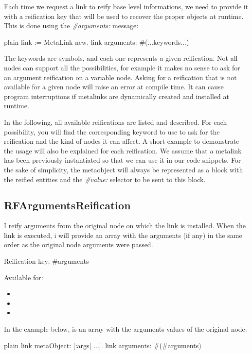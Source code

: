 \documentclass[10pt,twoside,english]{_support/latex/sbabook/sbabook}
\begin{document}
Each time we request a link to reify base level informations, we need to provide it with a reification key that will be used to recover the proper objects at runtime. This is done using the \textit{\#arguments:} message: 

\begin{displaycode}{plain}
link := MetaLink new.
link arguments: #(...keywords...)
\end{displaycode}

The keywords are symbols, and each one represents a given reification. Not all nodes can support all the possibilities, for example it makes no sense to ask for an argument reification on a variable node. Asking for a reification that is not available for a given node will raise an error at compile time. It can cause program interruptions if metalinks are dynamically created and installed at runtime.

In the following, all available reifications are listed and described. For each possibility, you will find the corresponding keyword to use to ask for the reification and the kind of nodes it can affect. A short example to demonstrate the usage will also be explained for each reification. We assume that a metalink has been previously instantiated so that we can use it in our code snippets. For the sake of simplicity, the metaobject will always be represented as a block with the reified entities and the \textit{\#value:} selector to be sent to this block.
\subsection{RFArgumentsReification}
I reify arguments from the original node on which the link is installed. When the link is executed, i will provide an array with the arguments (if any) in the same order as the original node arguments were passed.

Reification key: \#arguments

Available for:

\begin{itemize}
\item {}
\item {}
\item {}
\end{itemize}

In the example below,  is an array with the arguments values of the original node:

\begin{displaycode}{plain}
link metaObject: [:args| ...].
link arguments: #(#arguments)
\end{displaycode}
\end{document}
